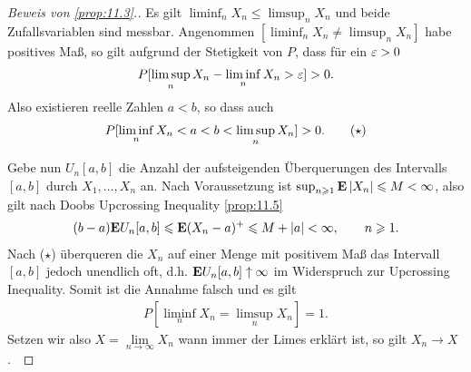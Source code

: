 \begin{proof}[Beweis von \ref{prop:11.3}.]
Es gilt $\liminf_n X_n \le \limsup_n X_n$ und beide Zufallsvariablen sind
messbar. Angenommen  $[\liminf_n X_n \neq \limsup_n X_n]$ habe positives Maß, so
gilt aufgrund der Stetigkeit von $P$, dass für ein $\varepsilon > 0$
\begin{align*}
P[\limsup_n X_n - \liminf_n X_n > \varepsilon] > 0.
\end{align*}
Also existieren reelle Zahlen $a < b$, so dass auch
\begin{align*}
P[\liminf_n X_n < a < b < \limsup_n X_n] > 0.\tag{\ensuremath{\star}}
\end{align*} 

Gebe nun $U_n[a,b]$ die Anzahl der aufsteigenden Überquerungen des Intervalls
$[a,b]$ durch $X_1,\ldots,X_n$ an. Nach Voraussetzung ist $\sup_{n\geqslant
1}\textbf{E} \left|X_n\right| \leqslant M < \infty$, also gilt nach Doobs Upcrossing Inequality
\ref{prop:11.5}
\begin{align*}
(b-a)\textbf{E} U_n[a,b] \leqslant \textbf{E} (X_n-a)^+  \leqslant M + \left|a\right|
<\infty,\qquad n\geqslant 1.
\end{align*} 
Nach ($\star$) überqueren die $X_n$ auf einer Menge mit positivem Maß  das
Intervall $[a,b]$ jedoch unendlich oft, d.h. $\textbf{E} U_n[a,b] \uparrow \infty$ im
Widerspruch zur Upcrossing Inequality. Somit ist die Annahme falsch und es gilt
\begin{align*}
P[\liminf_n X_n = \limsup_n X_n] = 1.
\end{align*}
Setzen wir also $X = \lim\limits_{n\to\infty} X_n$ wann immer der Limes erklärt
ist, so gilt $X_n\to X$ \fs.~\qedhere
% 
% 

\end{proof}
